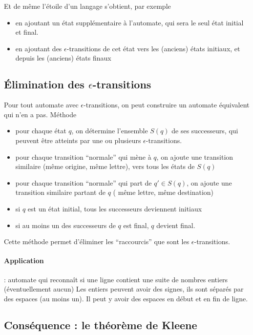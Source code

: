 \documentclass[10pt,twoside]{article}
\begin{document}
Et de même l'étoile d'un langage s'obtient, par exemple
\begin{itemize}
\item en ajoutant un état supplémentaire à l'automate, qui sera le 
seul état initial et final.
\item en ajoutant des $\epsilon$-transitions de cet état vers
les (anciens) états initiaux, et depuis les (anciens) états
finaux
\end{itemize}


\subsection{Élimination des $\epsilon$-transitions}

Pour tout automate avec $\epsilon$-transitions, on peut construire un
automate équivalent qui n'en a pas. Méthode
\begin{itemize}
\item pour chaque état $q$, on détermine l'ensemble $S(q)$ de ses
  successeurs, qui peuvent être atteints par une ou plusieurs
  $\epsilon$-transitions.
\item pour chaque transition ``normale'' qui mène à $q$, on ajoute une
  transition similaire (même origine, même lettre), vers tous les
  états de $S(q)$
 \item pour chaque transition ``normale'' qui part de $q' \in S(q)$,
   on ajoute une transition similaire partant de $q$ ( même lettre,
   même destination)
\item si $q$ est un état initial, tous les successeurs deviennent initiaux
\item si au moins un des successeurs de $q$ est final, $q$ devient final.
\end{itemize}

Cette méthode permet d'éliminer les ``raccourcis'' que sont les
$\epsilon$-transitions.

\paragraph{Application} : automate qui reconnaît si 
une ligne contient une suite de nombres entiers (éventuellement aucun)
Les entiers peuvent avoir des signes, ils sont séparés par
des espaces (au moins un). Il peut y avoir des espaces en début
et en fin de ligne.


\subsection{Conséquence : le théorème de Kleene}
\end{document}
